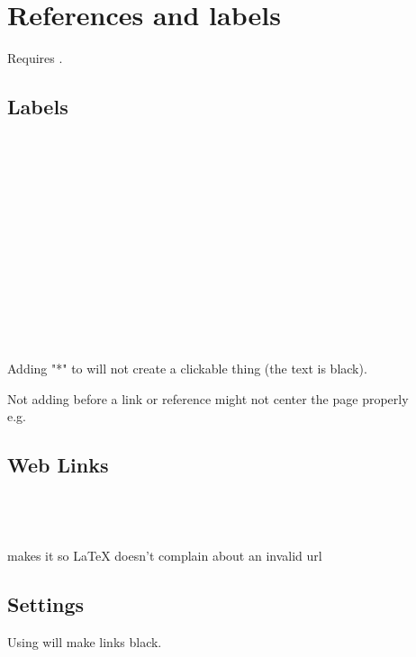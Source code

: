 \section{References and labels}\label{labels}
Requires .

\subsection{Labels}
\codeshow{\label{aLabel}}\\
\codeshow{\ref{aLabel}}\\
\codeshow{\ref*{aLabel}}\\
\\
\\
\codeshow{\pageref{aLabel}}\\
\\
\\
\\
\\
\\
\\
\codeshow{\eqref{aLabel}}

Adding "*" to  will not create a clickable thing (the text is black).

Not adding  before a link or reference might not center the page properly\\
e.g. 


\subsection{Web Links}
\\
\\
\\
\code{\nolinkurl} makes it so \LaTeX{} doesn't complain about an invalid url\\

\subsection{Settings}
Using \code{\usepackage[hidelinks]{hyperref}} will make links black.
